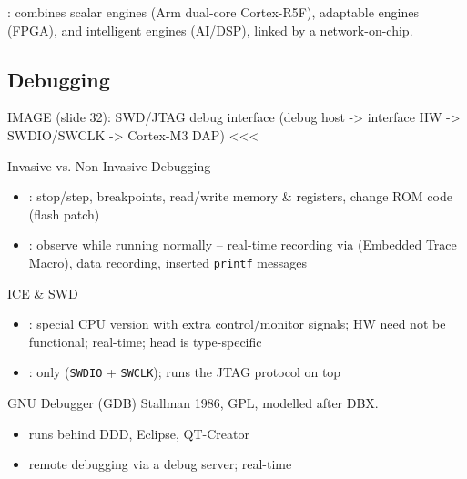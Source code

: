 \begin{remark}
    : combines scalar engines (Arm dual-core Cortex-R5F),
    adaptable engines (FPGA), and intelligent engines (AI/DSP), linked by a
    network-on-chip.
\end{remark}

\subsection{Debugging}

IMAGE (slide 32): SWD/JTAG debug interface (debug host -> interface HW -> SWDIO/SWCLK -> Cortex-M3 DAP) <<<

\begin{concept}{Invasive vs. Non-Invasive Debugging}
    \begin{itemize}
        \item {}: stop/step, breakpoints, read/write memory \&
              registers, change ROM code (flash patch)
        \item {}: observe while running normally --
              real-time recording via  (Embedded Trace Macro), data
              recording, inserted \texttt{printf} messages
    \end{itemize}
\end{concept}


\begin{definition}{ICE \& SWD}
    \begin{itemize}
        \item {}: special CPU version with extra
              control/monitor signals; HW need not be functional; real-time;
              head is type-specific
        \item {}: only 
              (\texttt{SWDIO} + \texttt{SWCLK}); runs the JTAG protocol on top
    \end{itemize}
\end{definition}

\begin{definition}{GNU Debugger (GDB)}
    Stallman 1986, GPL, modelled after DBX.
    \begin{itemize}
        \item runs behind DDD, Eclipse, QT-Creator
        \item remote debugging via a debug server;  real-time
    \end{itemize}
\end{definition}

